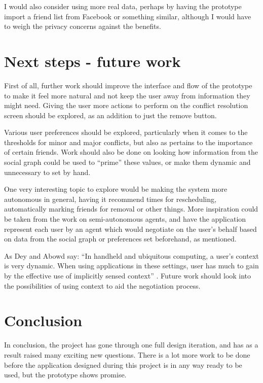 \documentclass[a4paper,11pt]{report}
\begin{document}
I would also consider using more real data, perhaps by having the prototype
import a friend list from Facebook or something similar, although I would have
to weigh the privacy concerns against the benefits.

\section{Next steps - future work}

First of all, further work should improve the interface and flow of the
prototype to make it feel more natural and not keep the user away from
information they might need. Giving the user more actions to perform on the
conflict resolution screen should be explored, as an addition to just the remove
button.

Various user preferences should be explored, particularly when it comes to the
thresholds for minor and major conflicts, but also as pertains to the importance
of certain friends. Work should also be done on looking how information from the
social graph could be used to ``prime'' these values, or make them dynamic and
unnecessary to set by hand.

One very interesting topic to explore would be making the system more autonomous
in general, having it recommend times for rescheduling, automatically marking
friends for removal or other things. More inspiration could be taken from the
work on semi-autonomous agents, and have the application represent each user by
an agent which would negotiate on the user's behalf based on data from the
social graph or preferences set beforehand, as mentioned.

As Dey and Abowd say\cite{dey99:towar}: ``In handheld and ubiquitous computing,
a user's context is very dynamic. When using applications in these settings,
user has much to gain by the effective use of implicitly sensed context''
. Future work should look into the possibilities of using context to aid the
negotiation process.

\section{Conclusion}

In conclusion, the project has gone through one full design iteration, and has
as a result raised many exciting new questions. There is a lot more work to be
done before the application designed during this project is in any way ready to
be used, but the prototype shows promise.
\end{document}
